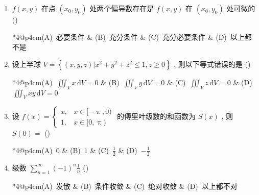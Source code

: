 \documentclass[cn,11pt,fancy,hide]{elegantbook}
\makeatletter
\newcommand{\dd}{\,\mathrm{d}}
\renewcommand{\leq}{\leqslant}
\renewcommand{\geq}{\geqslant}
\newcommand{\fourch}[4]{\\\begin{tabular}{*{4}{@{}p{4cm}}}(A)~#1 & (B)~#2 & (C)~#3 & (D)~#4\end{tabular}} %
\makeatother
\begin{document}
\begin{enumerate}
	\item $f(x,y)$ 在点 $(x_0,y_0)$ 处两个偏导数存在是 $f(x,y)$ 在 $(x_0,y_0)$ 处可微的 (\hspace{1pc})
	\fourch{必要条件}{充分条件}{充分必要条件}{以上都不是}
	
	\item 设上半球 $V=\left\{(x, y, z) | x^{2}+y^{2}+z^{2} \leq 1, z \geq 0\right\}$ , 则以下等式错误的是 (\hspace{1pc})
	\fourch{$\iiint_{V} x \dd V=0$}{$\iiint_{V} y \dd V=0$}{$\iiint_{V} z \dd V=0$}{$\iiint_{V} xy \dd V=0$}
	
	\item 设 $f(x)=\begin{cases}
	x, & x\in[-\uppi,0)\\
	1, & x\in[0,\uppi)
	\end{cases}$ 的傅里叶级数的和函数为 $S(x)$ , 则 $S(0)=$ (\hspace{1pc})
	\fourch{$0$}{$1$}{$\frac{1}{2}$}{$-\frac{1}{2}$}
	
	\item 级数 $\sum_{n=1}^{\infty}(-1)^{n} \frac{1}{n}$ (\hspace{1pc})
	\fourch{发散}{条件收敛}{绝对收敛}{以上都不对}
\end{enumerate}
\end{document}
